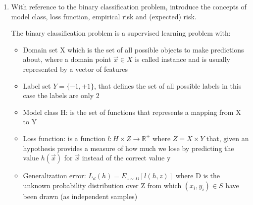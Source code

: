 \documentclass[a4paper,11pt,oneside]{book}
\begin{document}
\begin{enumerate}
\item With reference to the binary classification problem, introduce the concepts of model class, loss function, empirical risk and (expected) risk.
    \begin{solution}
        The binary classification problem is a supervised learning problem with:
        \begin{itemize}
        \item Domain set X which is the set of all possible objects to make predictions about, where a domain point $\vec{x} \in X$ is called instance and is usually represented by a vector of features
        
        \item Label set $Y = \{-1,+1\}$, that defines the set of all possible labels in this case the labels are only 2
        
        \item Model class H: is the set of functions that represents a mapping from X to Y
        
        \item Loss function: is a function $l: H\times Z \to \mathbb{R}^+$ where $Z = X\times Y$ that, given an hypothesis provides a measure of how much we lose by predicting the value $h(\vec{x})$ for $\vec{x}$ instead of the correct value y
        
        \item Generalization error: $L_d(h) = E_{z\sim D}[l(h,z)]$ where D is the unknown probability distribution over Z from which $(x_i,y_i) \in S$ have been drawn (as independent samples)
        

\end{itemize}
\end{solution}
\end{enumerate}
\end{document}
